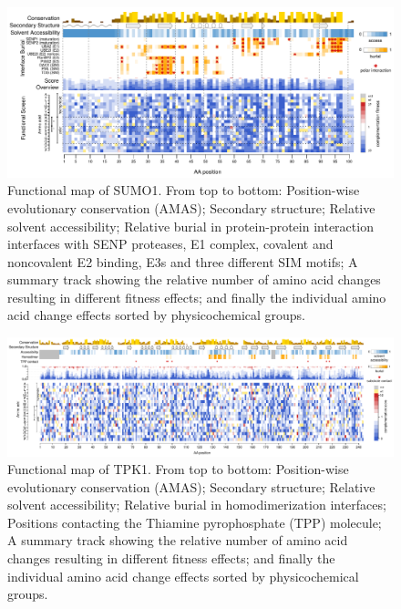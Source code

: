 \begin{appendices}
\begin{landscape}
\begin{figure}[h]
	\centering
	\includegraphics[width=9in]{img/sumo1_map_noflip.pdf}
	\caption{Functional map of SUMO1. From top to bottom: Position-wise evolutionary conservation (AMAS); Secondary structure; Relative solvent accessibility; Relative burial in protein-protein interaction interfaces with SENP proteases, E1 complex, covalent and noncovalent E2 binding, E3s and three different SIM motifs; A summary track showing the relative number of amino acid changes resulting in different fitness effects; and finally the individual amino acid change effects sorted by physicochemical groups.}
\end{figure}
\end{landscape}


\begin{landscape}
\begin{figure}[h]
	\centering
	\includegraphics[width=9in]{img/tpk1_map_noflip.pdf}
	\caption{Functional map of TPK1. From top to bottom: Position-wise evolutionary conservation (AMAS); Secondary structure; Relative solvent accessibility; Relative burial in homodimerization interfaces; Positions contacting the Thiamine pyrophosphate (TPP) molecule; A summary track showing the relative number of amino acid changes resulting in different fitness effects; and finally the individual amino acid change effects sorted by physicochemical groups.}
\end{figure}
\end{landscape}



\end{appendices}

